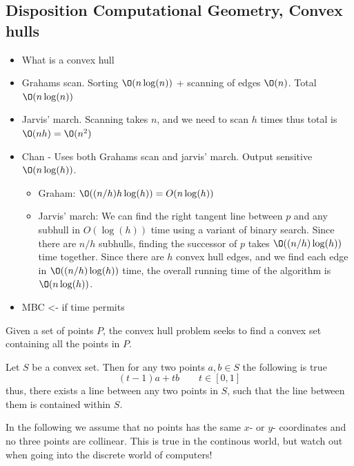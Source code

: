\documentclass[10pt]{article}
\begin{document}
\subsection{Disposition Computational Geometry, Convex hulls} %
\label{sub:disposition7}
\begin{itemize}
  \item What is a convex hull
  \item Grahams scan. Sorting $\O(n\log(n))$ + scanning of edges $\O(n)$. Total $\O(n\log(n))$
  \item Jarvis' march. Scanning takes $n$, and we need to scan $h$ times thus total is $\O(nh) = \O(n^2)$
  \item Chan - Uses both Grahams scan and jarvis' march. Output sensitive $\O(n\log(h))$.
  \begin{itemize}
    \item Graham: $\O((n/h)h\log(h)) = O(n\log(h))$
    \item Jarvis' march: We can find the right tangent line between $p$ and any subhull in $O(\log(h))$ time using a variant of binary search. Since there are $n/h$ subhulls, finding the successor of $p$ takes $\O((n/h)\log(h))$ time together. Since there are $h$ convex hull edges, and we find each edge in $\O((n/h)\log(h))$ time, the overall running time of the algorithm is $\O(n\log(h))$.                                                                                                                                         
  \end{itemize}
  \item MBC <- if time permits
\end{itemize}

\newpage 

Given a set of points $P$, the convex hull problem seeks to find a convex set containing all the points in $P$.

Let $S$ be a convex set. Then for any two points $a,b \in S$ the following is true
\begin{equation}
  (t-1)a+tb \qquad t \in [0,1]
\end{equation}
thus, there exists a line between any two points in $S$, such that the line between them is contained within $S$.

In the following we assume that no points has the same $x$- or $y$- coordinates and no three points are collinear. This is true in the continous world, but watch out when going into the discrete world of computers!
\end{document}
